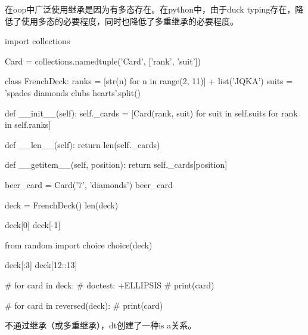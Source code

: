 在oop中广泛使用继承是因为有多态存在。在python中，由于duck typing存在，降低了使用多态的必要程度，同时也降低了多重继承的必要程度。

\begin{python}
import collections

Card = collections.namedtuple('Card', ['rank', 'suit'])

class FrenchDeck:
    ranks = [str(n) for n in range(2, 11)] + list('JQKA')
    suits = 'spades diamonds clubs hearts'.split()

    def __init__(self):
        self._cards = [Card(rank, suit) for suit in self.suits
                                        for rank in self.ranks]

    def __len__(self):
        return len(self._cards)

    def __getitem__(self, position):
        return self._cards[position]

beer_card = Card('7', 'diamonds')
beer_card

deck = FrenchDeck()
len(deck)

deck[0]
deck[-1]

from random import choice 
choice(deck)

deck[:3]
deck[12::13]

# for card in deck:  #  doctest: +ELLIPSIS
#     print(card)

# for card in reversed(deck):
#     print(card)
\end{python}





不通过继承（或多重继承），dt创建了一种is a关系。



